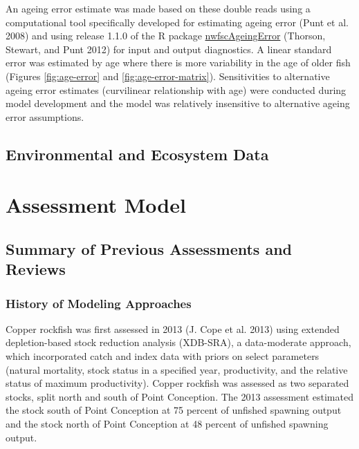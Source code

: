 \documentclass[11pt,
  english,
  letterpaper,
]{article}
\begin{document}
An ageing error estimate was made based on these double reads using a computational tool specifically developed for estimating ageing error (Punt et al. 2008) and using release 1.1.0 of the R package \href{https://github.com/nwfsc-assess/nwfscAgeingError}{nwfscAgeingError} (Thorson, Stewart, and Punt 2012) for input and output diagnostics. A linear standard error was estimated by age where there is more variability in the age of older fish (Figures \ref{fig:age-error} and \ref{fig:age-error-matrix}). Sensitivities to alternative ageing error estimates (curvilinear relationship with age) were conducted during model development and the model was relatively insensitive to alternative ageing error assumptions.

\hypertarget{environmental-and-ecosystem-data}{%
\subsection{Environmental and Ecosystem Data}\label{environmental-and-ecosystem-data}}

\hypertarget{assessment-model}{%
\section{Assessment Model}\label{assessment-model}}

\hypertarget{summary-of-previous-assessments-and-reviews}{%
\subsection{Summary of Previous Assessments and Reviews}\label{summary-of-previous-assessments-and-reviews}}

\hypertarget{history-of-modeling-approaches}{%
\subsubsection{History of Modeling Approaches}\label{history-of-modeling-approaches}}

Copper rockfish was first assessed in 2013 (J. Cope et al. 2013) using extended depletion-based stock reduction analysis (XDB-SRA), a data-moderate approach, which incorporated catch and index data with priors on select parameters (natural mortality, stock status in a specified year, productivity, and the relative status of maximum productivity). Copper rockfish was assessed as two separated stocks, split north and south of Point Conception. The 2013 assessment estimated the stock south of Point Conception at 75 percent of unfished spawning output and the stock north of Point Conception at 48 percent of unfished spawning output.
\end{document}
